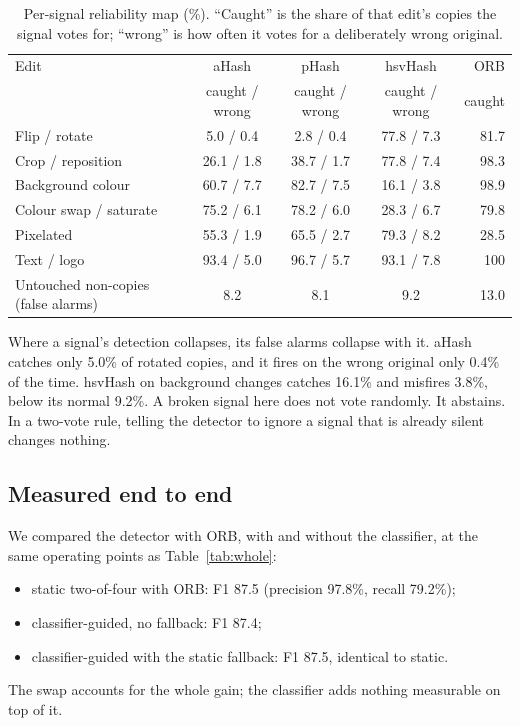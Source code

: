 \begin{table}[ht]
\centering\small
\begin{tabular}{@{}lccc r@{}}
\toprule
Edit & aHash & pHash & hsvHash & ORB \\
     & caught / wrong & caught / wrong & caught / wrong & caught \\
\midrule
Flip / rotate           & 5.0 / 0.4  & 2.8 / 0.4  & 77.8 / 7.3 & 81.7 \\
Crop / reposition       & 26.1 / 1.8 & 38.7 / 1.7 & 77.8 / 7.4 & 98.3 \\
Background colour       & 60.7 / 7.7 & 82.7 / 7.5 & 16.1 / 3.8 & 98.9 \\
Colour swap / saturate  & 75.2 / 6.1 & 78.2 / 6.0 & 28.3 / 6.7 & 79.8 \\
Pixelated               & 55.3 / 1.9 & 65.5 / 2.7 & 79.3 / 8.2 & 28.5 \\
Text / logo             & 93.4 / 5.0 & 96.7 / 5.7 & 93.1 / 7.8 & 100 \\
\midrule
Untouched non-copies (false alarms) & 8.2 & 8.1 & 9.2 & 13.0 \\
\bottomrule
\end{tabular}
\caption{Per-signal reliability map (\%). ``Caught'' is the share of that edit's copies the
signal votes for; ``wrong'' is how often it votes for a deliberately wrong original.}
\label{tab:reliability}
\end{table}

Where a signal's detection collapses, its false alarms collapse with it. aHash catches only
5.0\% of rotated copies, and it fires on the wrong original only 0.4\% of the time. hsvHash on
background changes catches 16.1\% and misfires 3.8\%, below its normal 9.2\%. A broken signal
here does not vote randomly. It abstains. In a two-vote rule, telling the detector to ignore a
signal that is already silent changes nothing.

\subsection{Measured end to end}

We compared the detector with ORB, with and without the classifier, at the same operating
points as Table~\ref{tab:whole}:
\begin{itemize}
  \item static two-of-four with ORB: F1 87.5 (precision 97.8\%, recall 79.2\%);
  \item classifier-guided, no fallback: F1 87.4;
  \item classifier-guided with the static fallback: F1 87.5, identical to static.
\end{itemize}
The swap accounts for the whole gain; the classifier adds nothing measurable on top of it.

